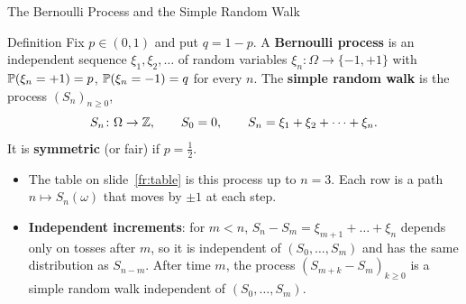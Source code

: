 \begin{frame}{The Bernoulli Process and the Simple Random Walk}
  \label{fr:walk}
  \small
  \begin{block}{Definition}
    Fix $p\in(0,1)$ and put $q=1-p$. A \textbf{Bernoulli process} is an independent sequence $\xi_1,\xi_2,\dots$ of random variables $\xi_n\colon\Omega\to\{-1,+1\}$ with $\mathbb{P}(\xi_n=+1)=p$, $\mathbb{P}(\xi_n=-1)=q$ for every $n$. The \textbf{simple random walk} is the process $(S_n)_{n\ge0}$,
    \[
      S_n\colon\Omega\to\mathbb{Z},\qquad S_0=0,\qquad S_n=\xi_1+\xi_2+\dots+\xi_n .
    \]
    It is \textbf{symmetric} (or fair) if $p=\tfrac12$.
  \end{block}
  \begin{itemize}
    \item The table on slide~\ref{fr:table} is this process up to $n=3$. Each row is a path $n\mapsto S_n(\omega)$ that moves by $\pm1$ at each step.
    \item \textbf{Independent increments}: for $m<n$, $S_n-S_m=\xi_{m+1}+\dots+\xi_n$ depends only on tosses after $m$, so it is independent of $(S_0,\dots,S_m)$ and has the same distribution as $S_{n-m}$. After time $m$, the process $(S_{m+k}-S_m)_{k\ge0}$ is a simple random walk independent of $(S_0,\dots,S_m)$.
  \end{itemize}
\end{frame}

